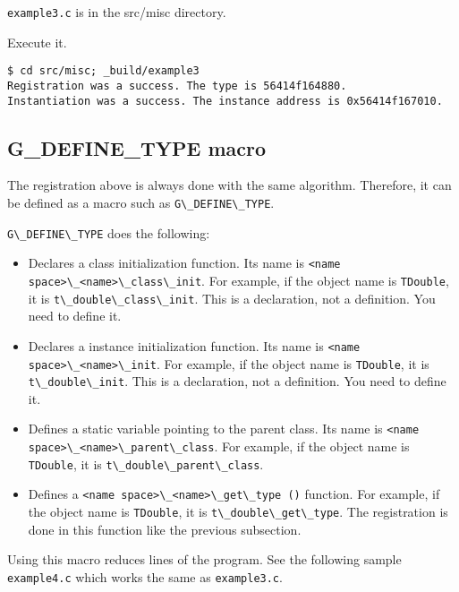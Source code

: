 \passthrough{\lstinline!example3.c!} is in the src/misc directory.

Execute it.

\begin{lstlisting}
$ cd src/misc; _build/example3
Registration was a success. The type is 56414f164880.
Instantiation was a success. The instance address is 0x56414f167010.
\end{lstlisting}

\subsection{G\_DEFINE\_TYPE macro}\label{g_define_type-macro}

The registration above is always done with the same algorithm.
Therefore, it can be defined as a macro such as
\passthrough{\lstinline!G\_DEFINE\_TYPE!}.

\passthrough{\lstinline!G\_DEFINE\_TYPE!} does the following:

\begin{itemize}
\tightlist
\item
  Declares a class initialization function. Its name is
  \passthrough{\lstinline!<name space>\_<name>\_class\_init!}. For
  example, if the object name is \passthrough{\lstinline!TDouble!}, it
  is \passthrough{\lstinline!t\_double\_class\_init!}. This is a
  declaration, not a definition. You need to define it.
\item
  Declares a instance initialization function. Its name is
  \passthrough{\lstinline!<name space>\_<name>\_init!}. For example, if
  the object name is \passthrough{\lstinline!TDouble!}, it is
  \passthrough{\lstinline!t\_double\_init!}. This is a declaration, not
  a definition. You need to define it.
\item
  Defines a static variable pointing to the parent class. Its name is
  \passthrough{\lstinline!<name space>\_<name>\_parent\_class!}. For
  example, if the object name is \passthrough{\lstinline!TDouble!}, it
  is \passthrough{\lstinline!t\_double\_parent\_class!}.
\item
  Defines a \passthrough{\lstinline!<name space>\_<name>\_get\_type ()!}
  function. For example, if the object name is
  \passthrough{\lstinline!TDouble!}, it is
  \passthrough{\lstinline!t\_double\_get\_type!}. The registration is
  done in this function like the previous subsection.
\end{itemize}

Using this macro reduces lines of the program. See the following sample
\passthrough{\lstinline!example4.c!} which works the same as
\passthrough{\lstinline!example3.c!}.

